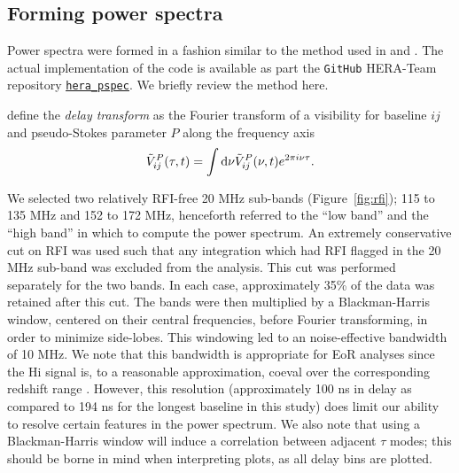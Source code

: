 \documentclass[twocolumn, trackchanges]{aastex61}
\begin{document}
{\subsection{Forming power spectra}
\label{subsec:pspec}

Power spectra were formed in a fashion similar to the method used in \cite{Pober13} and \cite{Kohn16}.  The actual implementation of the code is available as part the {\tt GitHub} HERA-Team repository 
\href{https://github.com/HERA-Team/hera_pspec}{\underline{{\tt hera\_pspec}}}.  We briefly review the method here.  

\cite{Parsons.12a} define the \textit{delay transform} as the Fourier transform of a visibility for baseline $ij$ and pseudo-Stokes parameter $P$ along the frequency axis
\begin{equation}
\label{eq:DelaySpectrum}
\tilde{V}_{ij}^{P}(\tau, t) = \int {\rm d}\nu \tilde{V}_{ij}^{P}(\nu, t)e^{2\pi i \nu \tau}.
\end{equation}

We selected two relatively RFI-free 20 MHz sub-bands (Figure~\ref{fig:rfi}); 115 to 135 MHz and 152 to 172 MHz, henceforth referred to the ``low band'' and the ``high band'' in which to compute the power spectrum.  An extremely conservative cut on RFI was used such that any integration which had RFI flagged in the 20 MHz sub-band was excluded from the analysis.  This cut was performed separately for the two bands.  In each case, approximately 35\% of the data was retained after this cut.  
The bands were then multiplied by a Blackman-Harris window, centered on their central frequencies, before Fourier transforming, in order to minimize side-lobes. This windowing led to an noise-effective bandwidth of 10 MHz.  We note that this bandwidth is appropriate for EoR analyses since the {\sc Hi} signal is, to a reasonable approximation, coeval over the corresponding redshift range \citep{Furlanetto06}.  However, this resolution (approximately 100 ns in delay as compared to 194 ns for the longest baseline in this study) does limit our ability to resolve certain features in the power spectrum. 
We also note that using a Blackman-Harris window will induce a correlation between adjacent $\tau$ modes; this should be borne in mind when interpreting plots, as all delay bins are plotted.

}
\end{document}
